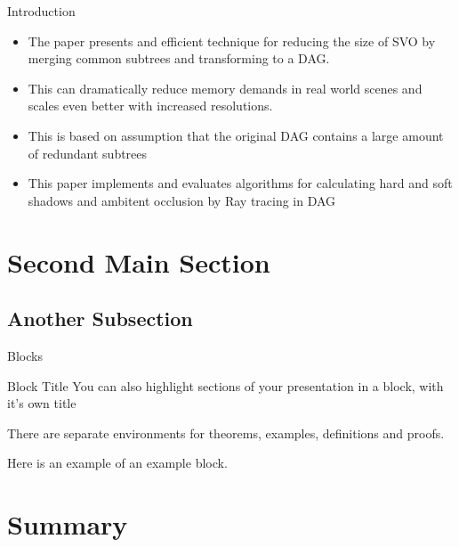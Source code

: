 \documentclass{beamer}
\begin{document}
\begin{frame}{Introduction}
  \begin{itemize}
  \item {
  		The paper presents and efficient technique for reducing the size of SVO by merging common subtrees and transforming to a DAG.
    }
    \item{
    	This can dramatically reduce memory demands in real world scenes and scales even better with increased resolutions.
    }
    \item{
    	This is based on assumption that the original DAG contains a large amount of redundant subtrees
    }
    \item{
    	This paper implements and evaluates algorithms for calculating hard and soft shadows and ambitent occlusion by Ray tracing in DAG 
    }
 
  \end{itemize}
 
\end{frame}

\section{Second Main Section}

\subsection{Another Subsection}

\begin{frame}{Blocks}
\begin{block}{Block Title}
You can also highlight sections of your presentation in a block, with it's own title
\end{block}
\begin{theorem}
There are separate environments for theorems, examples, definitions and proofs.
\end{theorem}
\begin{example}
Here is an example of an example block.
\end{example}
\end{frame}

\section*{Summary}
\end{document}
